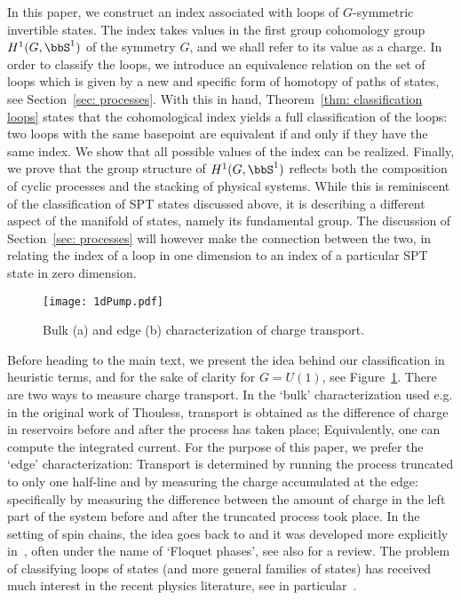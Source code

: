In this paper, we construct an index associated with loops of $G$-symmetric invertible states. The index takes values in the first group cohomology group $H^1(G,\bbS^1)$ of the symmetry $G$, and we shall refer to its value as a charge. In order to classify the loops, we introduce an equivalence relation on the set of loops which is given by a new and specific form of homotopy of paths of states, see Section~\ref{sec: processes}. With this in hand, Theorem~\ref{thm: classification loops} states that the cohomological index yields a full classification of the loops: two loops with the same basepoint are equivalent if and only if they have the same index. We show that all possible values of the index can be realized. Finally, we prove that the group structure of $H^1(G,\bbS^1)$ reflects both the composition of cyclic processes and the stacking of physical systems. While this is reminiscent of the classification of SPT states discussed above, it is describing a different aspect of the manifold of states, namely its fundamental group. The discussion of Section~\ref{sec: processes} will however make the connection between the two, in relating the index of a loop in one dimension to an index of a particular SPT state in zero dimension. 
%
\begin{figure}[htb]
	\begin{center}
		\texttt{[image: 1dPump.pdf]}
		\caption{Bulk (a) and edge (b) characterization of charge transport.} \label{fig: edge_characterization}
	\end{center}
\end{figure} 
%

Before heading to the main text, we present the idea behind our classification in heuristic terms, and for the sake of clarity for $G=U(1)$, see Figure~\ref{fig: edge_characterization}. There are two ways to measure charge transport. In the `bulk' characterization used e.g. in the original work of Thouless, transport is obtained as the difference of charge in reservoirs before and after the process has taken place; Equivalently, one can compute the integrated current. For the purpose of this paper, we prefer the `edge' characterization: Transport is determined by running the process truncated to only one half-line and by measuring the charge accumulated at the edge: specifically by measuring the difference between the amount of charge in the left part of the system before and after the truncated process took place.  In the setting of spin chains, the idea goes back to \cite{KitaevConf} and it was developed more explicitly in~\cite{Else_2014,Else_2016,potter2016classification,von2016phase}, often under the name of `Floquet phases', see also \cite{Xiong_2018} for a review. The problem of classifying loops of states (and more general families of states) has received much interest in the recent physics literature, see in particular~\cite{KunoHatsugai,kapustin2022local,wen2021flow,aasen2022adiabatic,shiozaki2022adiabatic}. 

